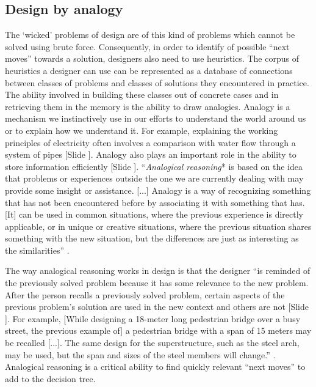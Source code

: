 \documentclass{article}
\newcounter{slide}
\begin{document}
\subsection{Design by analogy}
\label{sec:cbr}
The `wicked' problems of design are of this kind of problems which cannot be solved using brute force. Consequently, in order to identify of possible ``next moves'' towards a solution, designers also need to use heuristics. The corpus of heuristics a designer can use can be represented as a database of connections between classes of problems and classes of solutions they encountered in practice. The ability involved in building these classes out of concrete cases and in retrieving them in the memory is the ability to draw analogies. Analogy is a mechanism we instinctively use in our efforts to understand the world around us or to explain how we understand it. For example, explaining the working principles of electricity often involves a comparison with water flow through a system of pipes {\color{blue}[Slide ]}. Analogy also plays an important role in the ability to store information efficiently {\color{blue}[Slide ]}. ``\emph{Analogical reasoning}* is based on the idea that problems or experiences outside the one we are currently dealing with may provide some insight or assistance. [...] Analogy is a way of recognizing something that has not been encountered before by associating it with something that has. [It] can be used in common situations, where the previous experience is directly applicable, or in unique or creative situations, where the previous situation shares something with the new situation, but the differences are just as interesting as the similarities'' \cite[p. 1]{maher2014case}. 

The way analogical reasoning works in design is that the designer ``is reminded of the previously solved problem because it has some relevance to the new problem. After the person recalls a previously solved problem, certain aspects of the previous problem's solution are used in the new context and others are not {\color{blue}[Slide ]}. For example, [While designing a 18-meter long pedestrian bridge over a busy street, the previous example of] a pedestrian bridge with a span of 15 meters may be recalled [...]. The same design for the superstructure, such as the steel arch, may be used, but the span and sizes of the steel members will change.'' \cite[p. 1-4]{maher2014case}. Analogical reasoning is a critical ability to find quickly relevant ``next moves'' to add to the decision tree.
\end{document}
